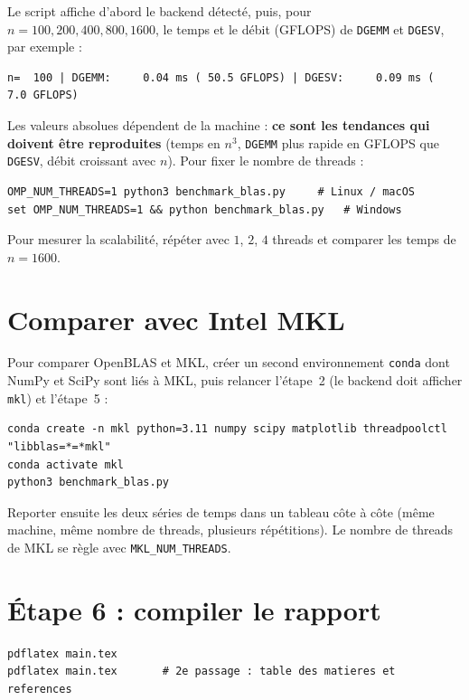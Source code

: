 \documentclass[11pt,a4paper]{report}
\theoremstyle{plain}
\theoremstyle{definition}
\theoremstyle{remark}
\begin{document}
\noindent Le script affiche d'abord le backend détecté, puis, pour $n=100,200,400,800,1600$, le temps et le débit (GFLOPS) de \texttt{DGEMM} et \texttt{DGESV}, par exemple :

\begin{lstlisting}[language={}]
n=  100 | DGEMM:     0.04 ms ( 50.5 GFLOPS) | DGESV:     0.09 ms (  7.0 GFLOPS)
\end{lstlisting}

\noindent Les valeurs absolues dépendent de la machine : \textbf{ce sont les tendances qui doivent être reproduites} (temps en $n^3$, \texttt{DGEMM} plus rapide en GFLOPS que \texttt{DGESV}, débit croissant avec $n$). Pour fixer le nombre de threads :

\begin{lstlisting}[language={}]
OMP_NUM_THREADS=1 python3 benchmark_blas.py     # Linux / macOS
set OMP_NUM_THREADS=1 && python benchmark_blas.py   # Windows
\end{lstlisting}

\noindent Pour mesurer la scalabilité, répéter avec $1$, $2$, $4$ threads et comparer les temps de $n=1600$.

\section{Comparer avec Intel MKL}

Pour comparer OpenBLAS et MKL, créer un second environnement \texttt{conda} dont NumPy et SciPy sont liés à MKL, puis relancer l'étape~2 (le backend doit afficher \texttt{mkl}) et l'étape~5 :

\begin{lstlisting}[language={}]
conda create -n mkl python=3.11 numpy scipy matplotlib threadpoolctl "libblas=*=*mkl"
conda activate mkl
python3 benchmark_blas.py
\end{lstlisting}

\noindent Reporter ensuite les deux séries de temps dans un tableau côte à côte (même machine, même nombre de threads, plusieurs répétitions). Le nombre de threads de MKL se règle avec \texttt{MKL\_NUM\_THREADS}.

\section{Étape 6 : compiler le rapport}

\begin{lstlisting}[language={}]
pdflatex main.tex
pdflatex main.tex       # 2e passage : table des matieres et references
\end{lstlisting}
\end{document}

